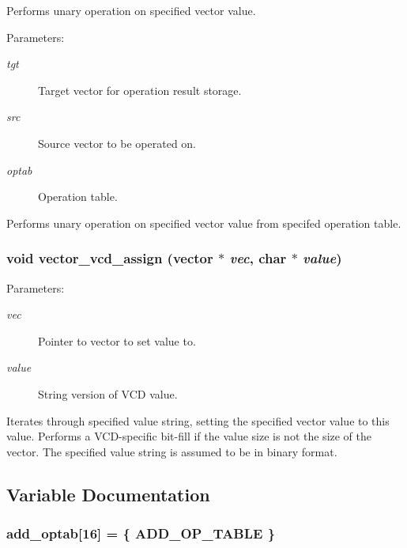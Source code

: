 Performs unary operation on specified vector value.

\begin{Desc}
\item[Parameters: ]\par
\begin{description}
\item[{\em 
tgt}]Target vector for operation result storage. \item[{\em 
src}]Source vector to be operated on. \item[{\em 
optab}]Operation table.\end{description}
\end{Desc}
Performs unary operation on specified vector value from specifed operation table. 
\subsubsection{\setlength{\rightskip}{0pt plus 5cm}void vector\_\-vcd\_\-assign ({\bf vector} $\ast$ {\em vec}, char $\ast$ {\em value})}\label{vector_8c_a32}


\begin{Desc}
\item[Parameters: ]\par
\begin{description}
\item[{\em 
vec}]Pointer to vector to set value to. \item[{\em 
value}]String version of VCD value.\end{description}
\end{Desc}
Iterates through specified value string, setting the specified vector value to this value. Performs a VCD-specific bit-fill if the value size is not the size of the vector. The specified value string is assumed to be in binary format. 

\subsection{Variable Documentation}
\subsubsection{ add\_\-optab[16] = \{ ADD\_\-OP\_\-TABLE \}}\label{vector_8c_a6}


